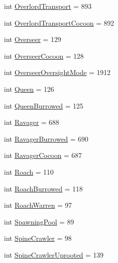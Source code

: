 \begin{DoxyCompactItemize}
int \mbox{\hyperlink{classpysc2_1_1lib_1_1units_1_1_zerg_a1a67df81a2aa1cba1fa2bf478c0e7612}{Overlord\+Transport}} = 893
\item 
int \mbox{\hyperlink{classpysc2_1_1lib_1_1units_1_1_zerg_a75d768affb2feb4cb65601093f4cffa2}{Overlord\+Transport\+Cocoon}} = 892
\item 
int \mbox{\hyperlink{classpysc2_1_1lib_1_1units_1_1_zerg_a4814c1d2661f5c1faacebcd587297d19}{Overseer}} = 129
\item 
int \mbox{\hyperlink{classpysc2_1_1lib_1_1units_1_1_zerg_ab29dc9e79fcdbd295a83d14e5498a31a}{Overseer\+Cocoon}} = 128
\item 
int \mbox{\hyperlink{classpysc2_1_1lib_1_1units_1_1_zerg_ae69f34f5005c6e70a2b9e4886af7e417}{Overseer\+Oversight\+Mode}} = 1912
\item 
int \mbox{\hyperlink{classpysc2_1_1lib_1_1units_1_1_zerg_a1ee227a38ecc70e86e2b81d5a0468315}{Queen}} = 126
\item 
int \mbox{\hyperlink{classpysc2_1_1lib_1_1units_1_1_zerg_aad29a71f93895bfde14fd788592bff9c}{Queen\+Burrowed}} = 125
\item 
int \mbox{\hyperlink{classpysc2_1_1lib_1_1units_1_1_zerg_a789d7958994c4ef740e727d2401ac111}{Ravager}} = 688
\item 
int \mbox{\hyperlink{classpysc2_1_1lib_1_1units_1_1_zerg_a5a65bda4e74fd539c19b3940fd4de22c}{Ravager\+Burrowed}} = 690
\item 
int \mbox{\hyperlink{classpysc2_1_1lib_1_1units_1_1_zerg_a30f2c2a83a578703534b12a5f2c0557e}{Ravager\+Cocoon}} = 687
\item 
int \mbox{\hyperlink{classpysc2_1_1lib_1_1units_1_1_zerg_a1255018127858d5bfb234e29b10bb874}{Roach}} = 110
\item 
int \mbox{\hyperlink{classpysc2_1_1lib_1_1units_1_1_zerg_aa71ba44842e3b252569f5b800e718da5}{Roach\+Burrowed}} = 118
\item 
int \mbox{\hyperlink{classpysc2_1_1lib_1_1units_1_1_zerg_a1b58c4f7fc2452e7034188b0d39ebf1f}{Roach\+Warren}} = 97
\item 
int \mbox{\hyperlink{classpysc2_1_1lib_1_1units_1_1_zerg_a10599adc99d7709ab44aeb5f910eadc4}{Spawning\+Pool}} = 89
\item 
int \mbox{\hyperlink{classpysc2_1_1lib_1_1units_1_1_zerg_ab5eb6aae637bc5cf0881ceb8dc3a0356}{Spine\+Crawler}} = 98
\item 
int \mbox{\hyperlink{classpysc2_1_1lib_1_1units_1_1_zerg_a28f04867a280b07bb0eaf1f974071559}{Spine\+Crawler\+Uprooted}} = 139
\item 

\end{DoxyCompactItemize}

